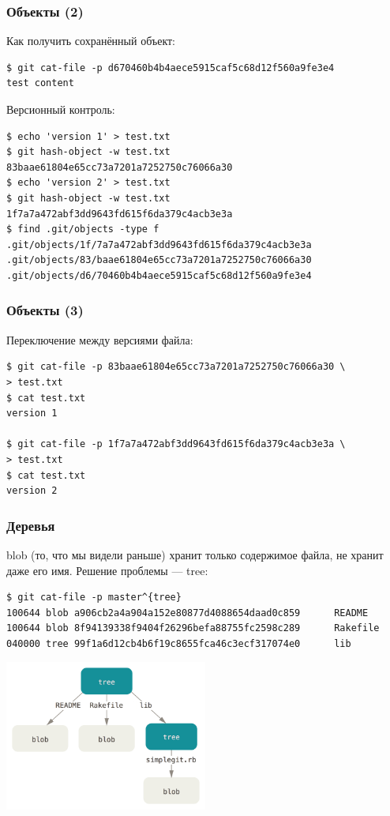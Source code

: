 \documentclass[xetex,mathserif,serif]{beamer}
\begin{document}
    \begin{frame}[fragile]
        \frametitle{Объекты (2)}
        Как получить сохранённый объект:
        \begin{verbatim}
$ git cat-file -p d670460b4b4aece5915caf5c68d12f560a9fe3e4
test content
        \end{verbatim}

        Версионный контроль:
        \begin{verbatim}
$ echo 'version 1' > test.txt
$ git hash-object -w test.txt
83baae61804e65cc73a7201a7252750c76066a30
$ echo 'version 2' > test.txt
$ git hash-object -w test.txt
1f7a7a472abf3dd9643fd615f6da379c4acb3e3a
$ find .git/objects -type f
.git/objects/1f/7a7a472abf3dd9643fd615f6da379c4acb3e3a
.git/objects/83/baae61804e65cc73a7201a7252750c76066a30
.git/objects/d6/70460b4b4aece5915caf5c68d12f560a9fe3e4
        \end{verbatim}
    \end{frame}

    \begin{frame}[fragile]
        \frametitle{Объекты (3)}
        Переключение между версиями файла:
        \begin{verbatim}
$ git cat-file -p 83baae61804e65cc73a7201a7252750c76066a30 \
> test.txt
$ cat test.txt
version 1

$ git cat-file -p 1f7a7a472abf3dd9643fd615f6da379c4acb3e3a \
> test.txt
$ cat test.txt
version 2
        \end{verbatim}
    \end{frame}

    \begin{frame}[fragile]
        \frametitle{Деревья}
        blob (то, что мы видели раньше) хранит только содержимое файла, не хранит даже его имя. Решение проблемы --- tree:
        \begin{scriptsize}
        \begin{verbatim}
$ git cat-file -p master^{tree}
100644 blob a906cb2a4a904a152e80877d4088654daad0c859      README
100644 blob 8f94139338f9404f26296befa88755fc2598c289      Rakefile
040000 tree 99f1a6d12cb4b6f19c8655fca46c3ecf317074e0      lib
        \end{verbatim}
        \end{scriptsize}
        \begin{center}
            \includegraphics[width=0.5\textwidth]{gitTreeObject.png}
        \end{center}
    \end{frame}
\end{document}
